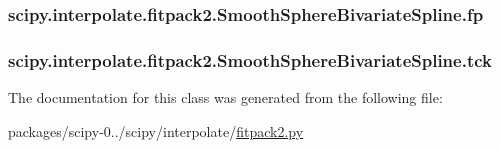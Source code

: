 \subsubsection[{fp}]{\setlength{\rightskip}{0pt plus 5cm}scipy.\+interpolate.\+fitpack2.\+Smooth\+Sphere\+Bivariate\+Spline.\+fp}\label{classscipy_1_1interpolate_1_1fitpack2_1_1SmoothSphereBivariateSpline_a7c891843e01965ad43419704abce494d}
\hypertarget{classscipy_1_1interpolate_1_1fitpack2_1_1SmoothSphereBivariateSpline_a2ff423e3917cc27ae7267453bab16358}{}
\subsubsection[{tck}]{\setlength{\rightskip}{0pt plus 5cm}scipy.\+interpolate.\+fitpack2.\+Smooth\+Sphere\+Bivariate\+Spline.\+tck}\label{classscipy_1_1interpolate_1_1fitpack2_1_1SmoothSphereBivariateSpline_a2ff423e3917cc27ae7267453bab16358}


The documentation for this class was generated from the following file\+:\begin{DoxyCompactItemize}
\item 
packages/scipy-\/0../scipy/interpolate/\hyperlink{fitpack2_8py}{fitpack2.\+py}\end{DoxyCompactItemize}
